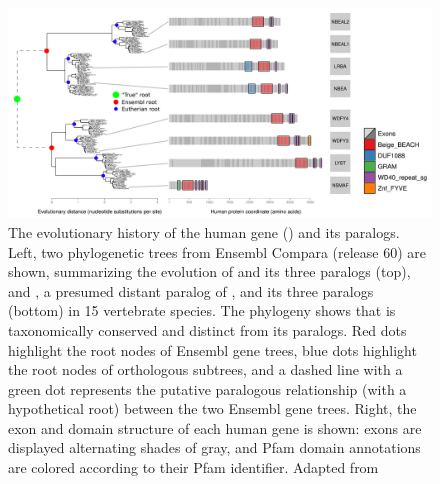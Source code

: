 \begin{figure}
\centering
\includegraphics[scale=0.35]{Figs/nbeal2_full.pdf}
\caption{The evolutionary history of the human  gene () and its paralogs. Left, two phylogenetic
  trees from Ensembl Compara (release 60) are shown, summarizing the
  evolution of  and its three paralogs (top), and
  , a presumed distant paralog of , and its
  three paralogs (bottom) in 15 vertebrate species. The phylogeny
  shows that  is taxonomically conserved and distinct
  from its paralogs. Red dots highlight the root nodes of Ensembl gene
  trees, blue dots highlight the root nodes of \euth orthologous
  subtrees, and a dashed line with a green dot represents the putative
  paralogous relationship (with a hypothetical root) between the two
  Ensembl gene trees. Right, the exon and domain structure of each
  human gene is shown: exons are displayed alternating shades of gray,
  and Pfam domain annotations are colored according to their Pfam
  identifier. Adapted from \citep{Albers2011}}
\label{nbeal2}
\end{figure}

